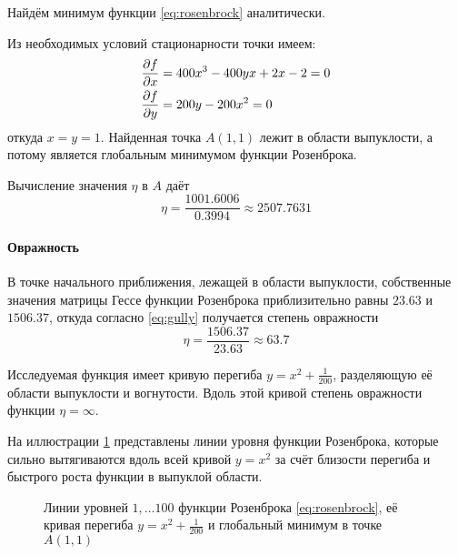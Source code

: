 Найдём минимум функции \eqref{eq:rosenbrock} аналитически.

Из необходимых условий стационарности точки имеем:
\begin{align*}
  \frac{\partial{f}}{\partial{x}} &= 400x^3-400yx+2x-2 = 0 \\
  \frac{\partial{f}}{\partial{y}} &= 200y-200x^2 = 0
\end{align*}
откуда $x = y = 1$. Найденная точка $A(1, 1)$ лежит в области
выпуклости, а потому является глобальным минимумом функции Розенброка.

Вычисление значения $\eta$ в $A$ даёт
\begin{equation}
  \label{eq:rosenbrock-gully-extr}
  \eta = \frac{1001.6006}{0.3994} \approx 2507.7631
\end{equation}

\paragraph{Овражность}

В точке начального приближения, лежащей в области выпуклости,
собственные значения матрицы Гессе функции Розенброка приблизительно
равны $23.63$ и $1506.37$, откуда согласно \eqref{eq:gully} получается
степень овражности
\begin{equation}
  \label{eq:rosenbrock-gully-start}
  \eta = \frac{1506.37}{23.63} \approx 63.7
\end{equation}

Исследуемая функция имеет кривую перегиба $y=x^2+\frac{1}{200}$,
разделяющую её области выпуклости и вогнутости. Вдоль этой кривой
степень овражности функции $\eta = \infty$.

На иллюстрации \ref{fig:rosenbrock-contours} представлены линии уровня
функции Розенброка, которые сильно вытягиваются вдоль всей кривой
$y=x^2$ за счёт близости перегиба и быстрого роста функции в выпуклой
области.

\begin{figure}[thb]
  \centering
  \caption[Функция Розенброка]{Линии уровней $1, \dotsc 100$ функции
    Розенброка \eqref{eq:rosenbrock}, её кривая перегиба
    $y=x^2+\frac{1}{200}$ и глобальный минимум в точке $A(1, 1)$}
  \label{fig:rosenbrock-contours}
\end{figure}

